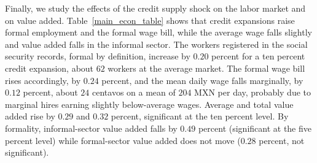 \documentclass[12pt]{article}
\begin{document}
\begin{table}[H]
    \caption{Shift-Share IV estimates of the effect of shocks on the number of firms with credit}
    \label{main_credit_table}
    \centering
    \small
    
\end{table}


%     


%     

Finally, we study the effects of the credit supply shock on the labor market and on value added. Table~\ref{main_econ_table} shows that credit expansions raise formal employment and the formal wage bill, while the average wage falls slightly and value added falls in the informal sector. The workers registered in the social security records, formal by definition, increase by $0.20$ percent for a ten percent credit expansion, about $62$ workers at the average market. The formal wage bill rises accordingly, by $0.24$ percent, and the mean daily wage falls marginally, by $0.12$ percent, about $24$ centavos on a mean of $204$ MXN per day, probably due to marginal hires earning slightly below-average wages. Average and total value added rise by $0.29$ and $0.32$ percent, significant at the ten percent level. By formality, informal-sector value added falls by $0.49$ percent (significant at the five percent level) while formal-sector value added does not move ($0.28$ percent, not significant).
\end{document}
